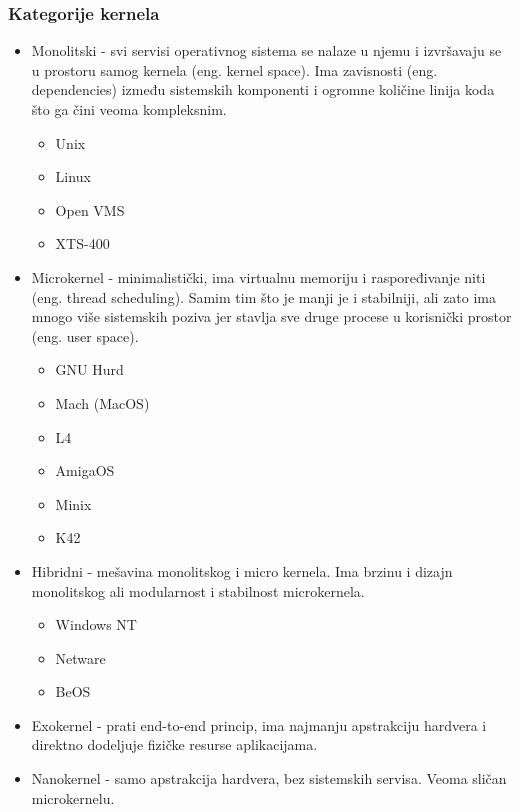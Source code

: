 \documentclass[a4paper,14pt]{article}
\begin{document}
\subsubsection{Kategorije kernela}
\begin{itemize}
\item Monolitski - svi servisi operativnog sistema se nalaze u njemu i izvršavaju se u prostoru samog kernela (eng. kernel space). Ima zavisnosti (eng. dependencies) između sistemskih komponenti i ogromne količine linija koda što ga čini veoma kompleksnim.
\begin{itemize}
\item Unix
\item Linux
\item Open VMS
\item XTS-400
\end{itemize}
\item Microkernel - minimalistički, ima virtualnu memoriju i raspoređivanje niti (eng. thread scheduling). Samim tim što je manji je i stabilniji, ali zato ima mnogo više sistemskih poziva jer stavlja sve druge procese u korisnički prostor (eng. user space).
\begin{itemize}
\item GNU Hurd
\item Mach (MacOS)
\item L4
\item AmigaOS
\item Minix
\item K42
\end{itemize}
\item Hibridni - mešavina monolitskog i micro kernela. Ima brzinu i dizajn monolitskog ali modularnost i stabilnost microkernela.
\begin{itemize}
\item Windows NT
\item Netware
\item BeOS
\end{itemize}
\item Exokernel - prati end-to-end princip, ima najmanju apstrakciju hardvera i direktno dodeljuje fizičke resurse aplikacijama.
\item Nanokernel - samo apstrakcija hardvera, bez sistemskih servisa. Veoma sličan microkernelu.
\end{itemize}
\newpage
\end{document}
